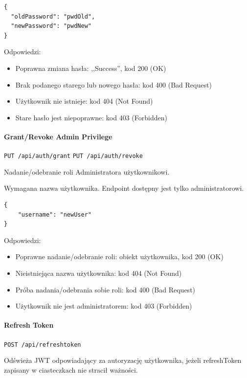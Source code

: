\documentclass[a4paper,twoside,12pt]{book}
\begin{document}
\begin{verbatim}
{
  "oldPassword": "pwdOld",
  "newPassword": "pwdNew"
}
\end{verbatim}

Odpowiedzi: 
\begin{itemize}
	\item Poprawna zmiana hasła: ,,Success'', kod 200 (OK)
	\item Brak podanego starego lub nowego hasła: kod 400 (Bad Request) 
	\item Użytkownik nie istnieje: kod 404 (Not Found) 
	\item Stare hasło jest niepoprawne: kod 403 (Forbidden)
\end{itemize}


\paragraph{Grant/Revoke Admin Privilege}\label{grantrevoke-admin-privilege}

\texttt{PUT /api/auth/grant} \texttt{PUT /api/auth/revoke}

Nadanie/odebranie roli Administratora użytkownikowi.

Wymagana nazwa użytkownika. Endpoint dostępny jest tylko administratorowi.

\begin{verbatim}
{
    "username": "newUser"
}
\end{verbatim}

Odpowiedzi: 
\begin{itemize}
	\item Poprawne nadanie/odebranie roli: obiekt użytkownika, kod 200 (OK) 
	\item Nieistniejąca nazwa użytkownika: kod 404 (Not Found) 
	\item Próba nadania/odebrania sobie roli: kod 400 (Bad Request) 
	\item Użytkownik nie jest administratorem: kod 403 (Forbidden)
\end{itemize}


\paragraph{Refresh Token}\label{refresh-token}

\texttt{POST /api/refreshtoken}

Odświeża JWT odpowiadający za autoryzację użytkownika, jeżeli refreshToken zapisany w ciasteczkach nie stracił ważności.
\end{document}
